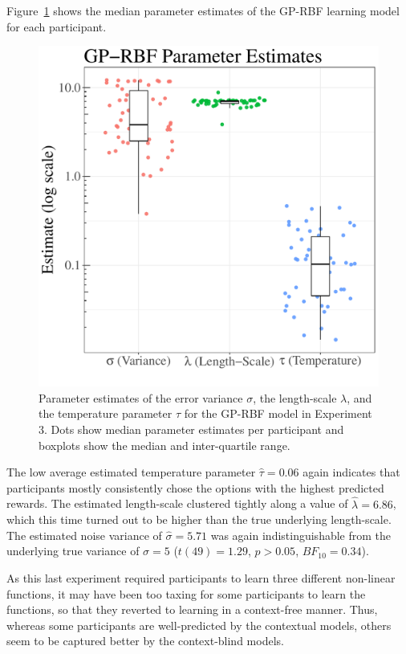 \documentclass[a4paper,natbib]{apa6}
\begin{document}
Figure~\ref{fig:par3} shows the median parameter estimates of the GP-RBF learning model for each participant.

\begin{figure}[ht!]
\centering
\includegraphics[scale=0.5]{par3.pdf}
\caption{Parameter estimates of the error variance $\sigma$, the length-scale $\lambda$, and the temperature parameter $\tau$ for the GP-RBF model in Experiment 3. Dots show median parameter estimates per participant and boxplots show the median and inter-quartile range.}
\label{fig:par3}
\end{figure}
%
The low average estimated temperature parameter $\hat{\tau}=0.06$ again indicates that participants mostly consistently chose the options with the highest predicted rewards. The estimated length-scale clustered tightly along a value of $\hat{\lambda}=6.86$, which this time turned out to be higher than the true underlying length-scale. The estimated noise variance of $\hat{\sigma}=5.71$ was again indistinguishable from the underlying true variance of $\sigma=5$ ($t(49)=1.29$, $p>0.05$, $BF_{10}= 0.34$).

As this last experiment required participants to learn three different non-linear functions, it may have been too taxing for some participants to learn the functions, so that they reverted to learning in a context-free manner. Thus, whereas some participants are well-predicted by the contextual models, others seem to be captured better by the context-blind models.
\end{document}
